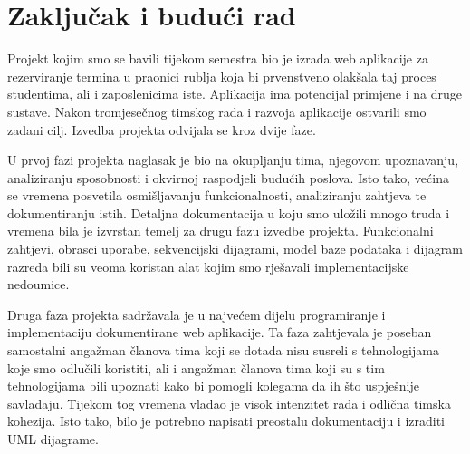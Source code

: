 \chapter{Zaključak i budući rad}
		\begin{comment}
			content..\textbf{\textit{dio 2. revizije}}\\
			
			\textit{U ovom poglavlju potrebno je napisati osvrt na vrijeme izrade projektnog zadatka, koji su tehnički izazovi prepoznati, jesu li riješeni ili kako bi mogli biti riješeni, koja su znanja stečena pri izradi projekta, koja bi znanja bila posebno potrebna za brže i kvalitetnije ostvarenje projekta i koje bi bile perspektive za nastavak rada u projektnoj grupi.}
			
			\textit{Potrebno je točno popisati funkcionalnosti koje nisu implementirane u ostvarenoj aplikaciji.}.
		\end{comment}
		
		Projekt kojim smo se bavili tijekom semestra bio je izrada web aplikacije 
		za rezerviranje termina u praonici rublja koja bi
		prvenstveno olakšala taj proces studentima, ali i zaposlenicima iste. Aplikacija ima potencijal primjene  i na druge sustave.
		Nakon tromjesečnog
		timskog rada i razvoja aplikacije ostvarili smo zadani cilj. Izvedba projekta
		odvijala se kroz dvije faze.
		
		U prvoj fazi projekta naglasak je bio na okupljanju tima, 
		njegovom upoznavanju, analiziranju sposobnosti i okvirnoj raspodjeli
		budućih poslova. Isto tako, većina se vremena posvetila
		osmišljavanju funkcionalnosti, analiziranju zahtjeva te 
		dokumentiranju istih. Detaljna dokumentacija u koju smo uložili mnogo truda
		i vremena bila je izvrstan temelj za drugu fazu izvedbe projekta. 
		Funkcionalni zahtjevi, obrasci uporabe, sekvencijski dijagrami, model baze
		podataka i dijagram razreda bili su veoma koristan alat kojim smo rješavali
		implementacijske nedoumice. 
		
		Druga faza projekta sadržavala je u najvećem dijelu programiranje i
		implementaciju dokumentirane web aplikacije. Ta faza zahtjevala je 
		poseban samostalni angažman članova tima koji se dotada nisu susreli
		s tehnologijama koje smo odlučili koristiti, ali i angažman 
		članova tima koji su s tim tehnologijama bili upoznati kako bi
		pomogli kolegama da ih što uspješnije savladaju. Tijekom tog vremena
		vladao je visok intenzitet rada i odlična timska kohezija. Isto tako, 
		bilo je potrebno napisati preostalu dokumentaciju i izraditi UML dijagrame.
		
